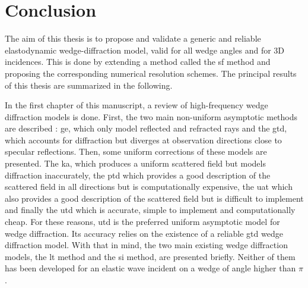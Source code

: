 \chapter*{Conclusion}

The aim of this thesis is to propose and validate a generic and reliable elastodynamic wedge-diffraction model, valid for all wedge angles and for 3D incidences. This is done by extending a method called the \acrfull{sf} method and proposing the corresponding numerical resolution schemes. The principal results of this thesis are summarized in the following.

In the first chapter of this manuscript, a review of high-frequency wedge diffraction models is done. First, the two main non-uniform asymptotic methods are described : \acrfull{ge}, which only model reflected and refracted rays and the \acrfull{gtd}, which accounts for diffraction but diverges at observation directions close to specular reflections. Then, some uniform corrections of these models are presented. The \acrfull{ka}, which produces a uniform scattered field but models diffraction inaccurately, the \acrfull{ptd} which provides a good description of the scattered field in all directions but is computationally expensive, the \acrfull{uat} which also provides a good description of the scattered field but is difficult to implement and finally the \acrfull{utd} which is accurate, simple to implement and computationally cheap. For these reasons, \acrshort{utd} is the preferred uniform asymptotic model for wedge diffraction. Its accuracy relies on the existence of a reliable \acrshort{gtd} wedge diffraction model. With that in mind, the two main existing wedge diffraction models, the \acrfull{lt} method and the \acrfull{si} method, are presented briefly. Neither of them has been developed for an elastic wave incident on a wedge of angle higher than $\pi$.

